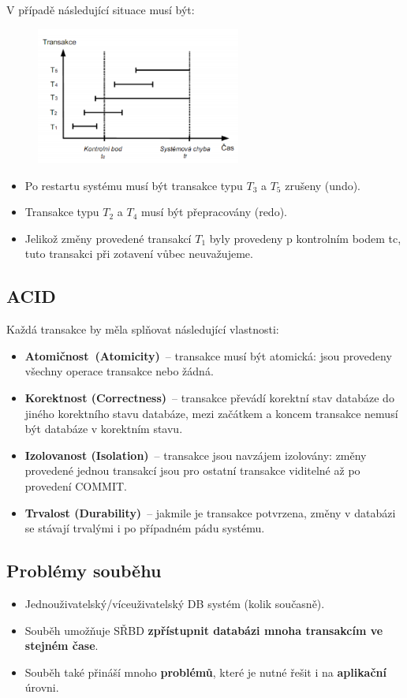 \noindent V případě následující situace musí být:
\begin{figure}[H]
\centering
\includegraphics[width=0.6\textwidth]{assets/kontrolni_body.png}
\end{figure}

\begin{itemize}
\item Po restartu systému musí být transakce typu $ T_3 $ a $ T_5 $ zrušeny (undo).
\item Transakce typu $T_2$ a $T_4$ musí být přepracovány (redo).
\item Jelikož změny provedené transakcí $ T_1 $ byly provedeny p kontrolním bodem tc, tuto transakci při zotavení vůbec neuvažujeme.
\end{itemize}

\subsection{ACID}
Každá transakce by měla splňovat následující vlastnosti:
\begin{itemize}
\item\textbf{Atomičnost (Atomicity)} -- transakce musí být atomická: jsou provedeny všechny operace transakce nebo žádná.
\item\textbf{Korektnost (Correctness)} – transakce převádí korektní stav databáze do jiného korektního stavu databáze, mezi začátkem a koncem transakce nemusí být databáze v korektním stavu.
\item\textbf{Izolovanost (Isolation)} – transakce jsou navzájem izolovány: změny provedené jednou transakcí jsou pro ostatní transakce viditelné až po provedení COMMIT. 
\item\textbf{Trvalost (Durability)} – jakmile je transakce potvrzena, změny v databázi se stávají trvalými i po případném pádu systému.
\end{itemize}

\subsection{Problémy souběhu}
\begin{itemize}
\item Jednouživatelský/víceuživatelský DB systém (kolik současně).
\item Souběh umožňuje SŘBD \textbf{zpřístupnit databázi mnoha transakcím ve stejném čase}.
\item Souběh také přináší mnoho \textbf{problémů}, které je nutné řešit i na \textbf{aplikační} úrovni.
\end{itemize}

